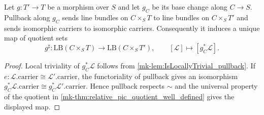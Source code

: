 \begin{theorem}\label{mk-thm:pullback_natural}
  \leanok

  Let $g:T'\to T$ be a morphism over $S$ and let $g_C$ be its base change along
  $C\to S$.  Pullback along $g_C$ sends line bundles on $C\times_S T$ to line
  bundles on $C\times_S T'$ and sends isomorphic carriers to isomorphic
  carriers.  Consequently it induces a unique map of quotient sets
  \[
    g^\sharp:\mathrm{LB}(C\times_S T)\longrightarrow
                    \mathrm{LB}(C\times_S T'),
    \qquad [\mathcal L]\longmapsto[g_C^*\mathcal L].
  \]
\end{theorem}
\begin{proof}
  \leanok
  Local triviality of $g_C^*\mathcal L$ follows from
  \ref{mk-lem:IsLocallyTrivial_pullback}.  If
  $e:\mathcal L.\mathrm{carrier}\cong\mathcal L'.\mathrm{carrier}$, the
  functoriality of pullback gives an isomorphism
  $g_C^*\mathcal L.\mathrm{carrier}\cong g_C^*\mathcal L'.\mathrm{carrier}$.
  Hence pullback respects $\sim$ and the universal property of the quotient in
  \ref{mk-thm:relative_pic_quotient_well_defined} gives the displayed map.
\end{proof}
